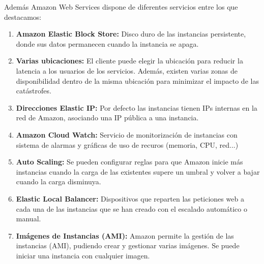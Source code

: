 Además Amazon Web Services dispone de diferentes servicios entre los que destacamos:
\begin{enumerate}
    \item \textbf{Amazon Elastic Block Store: } Disco duro de las instancias persistente, donde sus datos permanecen cuando la instancia se apaga.
    \item \textbf{Varias ubicaciones: }El cliente puede elegir la ubicación para reducir la latencia a los usuarios de los servicios. Además, existen varias zonas de disponibilidad dentro de la misma ubicación para minimizar el impacto de las catástrofes.
    \item \textbf{Direcciones Elastic IP: }Por defecto las instancias tienen IPs internas en la red de Amazon, asociando una IP pública a una instancia.
    \item \textbf{Amazon Cloud Watch: }Servicio de monitorización de instancias con sistema de alarmas y gráficas de uso de recuros (memoria, CPU, red...)
    \item \textbf{Auto Scaling: } Se pueden configurar reglas para que Amazon inicie más instancias cuando la carga de las existentes supere un umbral y volver a bajar cuando la carga disminuya.
    \item \textbf{Elastic Local Balancer: } Dispositivos que reparten las peticiones web a cada una de las instancias que se han creado con el escalado automático o manual.
    \item \textbf{Imágenes de Instancias (AMI): } Amazon permite la gestión de las instancias (AMI), pudiendo crear y gestionar varias imágenes. Se puede iniciar una instancia con cualquier imagen.
\end{enumerate}
